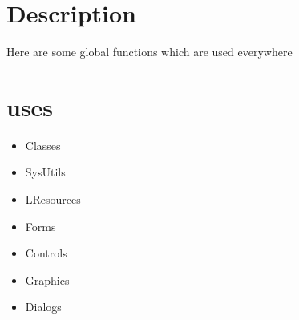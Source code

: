 \documentclass{report}
\begin{document}
\section{Description}
Here are some global functions which are used everywhere
\section{uses}
\begin{itemize}
\item \begin{ttfamily}Classes\end{ttfamily}\item \begin{ttfamily}SysUtils\end{ttfamily}\item \begin{ttfamily}LResources\end{ttfamily}\item \begin{ttfamily}Forms\end{ttfamily}\item \begin{ttfamily}Controls\end{ttfamily}\item \begin{ttfamily}Graphics\end{ttfamily}\item \begin{ttfamily}Dialogs\end{ttfamily}\
\end{itemize}
\end{document}
